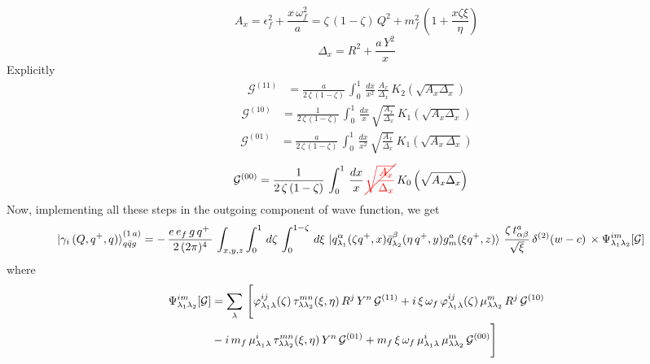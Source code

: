 \documentclass[9pt]{article}
\newcommand{\chg}[1]{{\color{red}#1}}
\newcommand{\del}[1]{{\color{red}\cancel{#1}}}
\numberwithin{equation}{section}
\begin{document}
\begin{enumerate}
$$A_{x} = \epsilon^{2}_{f} + \frac{x\,\omega^{2}_{f}}{a} = \zeta\,(1-\zeta)\,Q^{2} +m^{2}_{f}\,\left(1+\frac{x\zeta\xi}{\eta}\right)$$
$$\Delta_{x} = R^{2} + \frac{a\,Y^{2}}{x}$$
\label{chg:ty3a}\chg{Explicitly}
\begin{align}
    \mathcal{G}^{(11)} & = \frac{a}{2\,\zeta\, (1-\zeta)}\, \int_{0}^{1}\, \frac{dx}{x^{2}}\, \frac{A_{x}}{\Delta_{x}}\,K_{2}\left(\sqrt{A_{x}\Delta_{x}}\right)
\end{align}
\begin{align}
    \mathcal{G}^{(10)} & = \frac{1}{2\, \zeta\, (1-\zeta)}\, \int_{0}^{1}\, \frac{dx}{x}\, \sqrt{\frac{A_{x}}{\Delta_{x}}}\, K_{1}\left(\sqrt{A_{x}\Delta_{x}}\right)
\end{align}
\begin{align}
     \mathcal{G}^{(01)} & = \frac{a}{2\, \zeta\, (1-\zeta)}\, \int_{0}^{1}\, \frac{dx}{x^{2}}\, \sqrt{\frac{A_{x}}{\Delta_{x}}}\, K_{1}\left(\sqrt{A_{x}\,\Delta_{x}}\right)
\end{align}
\begin{align}
     \mathcal{G}^{(00)} & = \frac{1}{2\, \zeta\, (1-\zeta)}\, \int_{0}^{1}\, \frac{dx}{x}\, \del{\sqrt{\frac{A_{x}}{\Delta_{x}}}}\, K_{0}\left(\sqrt{A_{x}\Delta_{x}}\right)
\label{chg:G00a}\end{align}
Now, implementing all these steps in the outgoing component of wave function, we get
\begin{align}
    \ket{\gamma_{i}\,(Q,q^{+},q)}^{(1\,a)}_{q\Bar{q}g} &  = -\,\frac{e\,e_{f}\,g\,q^{+}\,}{2\,(2\pi)^{4}}\, \int_{x,y,z} \int_{0}^{1}\, d\zeta\, \int_{0}^{1-\zeta}\, d\xi\,\ket{q^{\alpha}_{\lambda_{1}}(\zeta q^{+},x)\Bar{q}^{\beta}_{\lambda_{2}}(\eta\,q^{+},y)g^{a}_{m}(\xi q^{+},z)}\, \frac{\zeta\, t^{a}_{\alpha\beta}}{\sqrt{\xi}}\, \delta^{(2)}(w-c)\,\times \Psi^{im}_{\lambda_{1}\lambda_{2}}[\mathcal{G}]
\end{align}
where 
\begin{align}
  \Psi^{im}_{\lambda_{1}\lambda_{2}}[\mathcal{G}] & = \sum_{\lambda}\, \Bigg[\varphi^{ij}_{\lambda_{1}\lambda}(\zeta)\,\tau^{mn}_{\lambda\lambda_{2}}(\xi,\eta)\,R^{j}\,Y^{n}\,\mathcal{G}^{(11)}+i\,\xi\,\omega_{f}\,\varphi^{ij}_{\lambda_{1}\lambda}(\zeta)\,\mu^{m}_{\lambda\lambda_{2}}\,R^{j}\,\mathcal{G}^{(10)}\notag \\ & -i\,m_{f}\,\mu^{i}_{\lambda_{1}\lambda}\,\tau^{mn}_{\lambda\lambda_{2}}(\xi,\eta)\,Y^{n}\,\mathcal{G}^{(01)} + m_{f}\,\xi\,\omega_{f}\,\mu^{i}_{\lambda_{1}\lambda}\,\mu^{m}_{\lambda\lambda_{2}}\,\mathcal{G}^{(00)}\Bigg]  
\end{align}

\end{enumerate}
\end{document}
